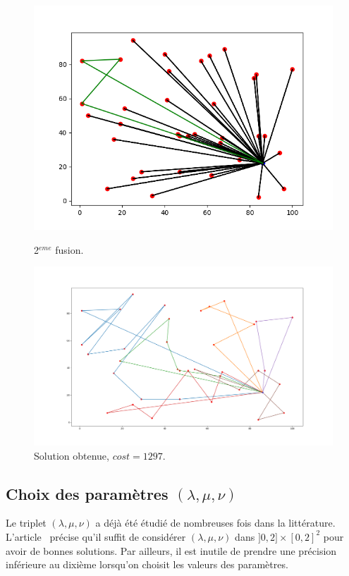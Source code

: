 \documentclass[a4paper,11pt]{article}%
\begin{document}
\begin{figure}
    \begin{minipage}[c]{.46\linewidth}
        \centering
	\includegraphics[scale=0.4]{CW2.png}
	\caption{2$^{eme}$ fusion.}
	\label{CW2}
    \end{minipage}
    \hfill%
    \begin{minipage}[c]{.46\linewidth}
        \centering
	 \includegraphics[scale=0.17]{resCW101010.png}
	 \caption{Solution obtenue, $cost = 1297$.}
	\label{resCW101010}
    \end{minipage}
\end{figure}

\subsection{Choix des paramètres $(\lambda, \mu, \nu)$}
Le triplet $(\lambda, \mu, \nu)$ a déjà été étudié de nombreuses fois dans la littérature. L'article~\cite{Altinel_2005} précise qu'il suffit de considérer $(\lambda, \mu, \nu)$ dans $]0,2] \times [0,2]^2$ pour avoir de bonnes solutions. 
Par ailleurs, il est inutile de prendre une précision inférieure au dixième lorsqu'on choisit les valeurs des paramètres.
\end{document}
